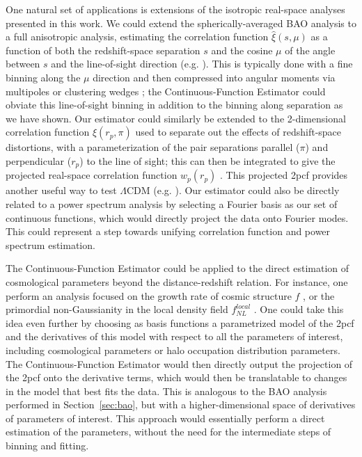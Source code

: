 \documentclass[modern]{aastex62}
\newcommand{\cf}{2pcf\xspace}
\newcommand{\Est}{The Continuous-Function Estimator\xspace}
\newcommand{\est}{the Continuous-Function Estimator\xspace}
\begin{document}
One natural set of applications is extensions of the isotropic real-space analyses presented in this work.
We could extend the spherically-averaged BAO analysis to a full anisotropic analysis, estimating the correlation function $\hat{\xi}(s, \mu)$ as a function of both the redshift-space separation $s$ and the cosine $\mu$ of the angle between $s$ and the line-of-sight direction (e.g. \citealt{Anderson2013}).
This is typically done with a fine binning along the $\mu$ direction and then compressed into angular moments via multipoles or clustering wedges \citep{Kazin2012}; \est could obviate this line-of-sight binning in addition to the binning along separation as we have shown.
Our estimator could similarly be extended to the 2-dimensional correlation function  $\hat{\xi}(r_p, \pi)$ used to separate out the effects of redshift-space distortions, with a parameterization of the pair separations parallel ($\pi$) and perpendicular ($r_p$) to the line of sight; this can then be integrated to give the projected real-space correlation function $w_p(r_p)$ \citep{DavisPeebles1983}.
This projected \cf provides another useful way to test $\Lambda$CDM (e.g. \citealt{Nuza2013}).
Our estimator could also be directly related to a power spectrum analysis by selecting a Fourier basis as our set of continuous functions, which would directly project the data onto Fourier modes.
This could represent a step towards unifying correlation function and power spectrum estimation.

\Est could be applied to the direct estimation of cosmological parameters beyond the distance-redshift relation.
For instance, one perform an analysis focused on the growth rate of cosmic structure $f$ \citep{Satpathy2016, Reid2018}, or the primordial non-Gaussianity in the local density field $f^{local}_{NL}$ \citep{Karagiannis2014}.
One could take this idea even further by choosing as basis functions a parametrized model of the \cf and the derivatives of this model with respect to all the parameters of interest, including cosmological parameters or halo occupation distribution parameters.
\Est would then directly output the projection of the \cf onto the derivative terms, which would then be translatable to changes in the  model that best fits the data.
This is analogous to the BAO analysis performed in Section~\ref{sec:bao}, but with a higher-dimensional space of derivatives of parameters of interest.
This approach would essentially perform a direct estimation of the parameters, without the need for the intermediate steps of binning and fitting.     
\end{document}

